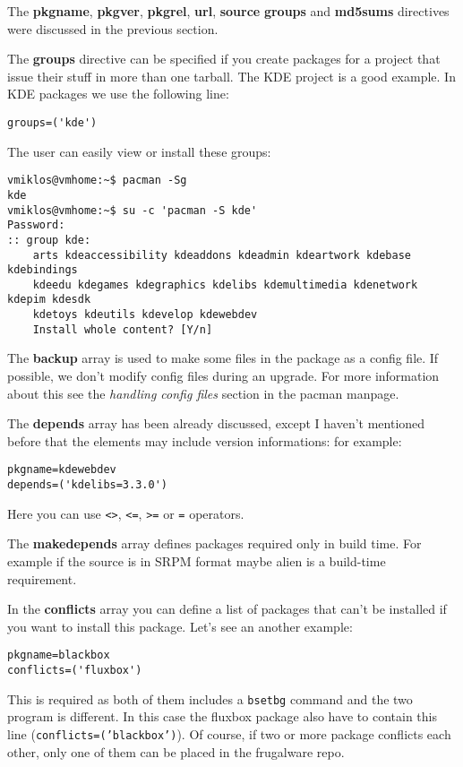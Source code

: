 The \textbf{pkgname}, \textbf{pkgver}, \textbf{pkgrel}, \textbf{url}, \textbf{source} \textbf{groups} and \textbf{md5sums} directives were discussed in the previous section.

The \textbf{groups} directive can be specified if you create packages for a project that issue their stuff in more than one tarball. The KDE project is a good example. In KDE packages we use the following line:
\begin{verbatim}
groups=('kde')
\end{verbatim}

The user can easily view or install these groups:
\begin{verbatim}
vmiklos@vmhome:~$ pacman -Sg
kde
vmiklos@vmhome:~$ su -c 'pacman -S kde'
Password:
:: group kde:
    arts kdeaccessibility kdeaddons kdeadmin kdeartwork kdebase kdebindings
    kdeedu kdegames kdegraphics kdelibs kdemultimedia kdenetwork kdepim kdesdk
    kdetoys kdeutils kdevelop kdewebdev
    Install whole content? [Y/n]
\end{verbatim}

The \textbf{backup} array is used to make some files in the package as a config file. If possible, we don't modify config files during an upgrade. For more information about this see the \textit{handling config files} section in the pacman manpage.

The \textbf{depends} array has been already discussed, except I haven't mentioned before that the elements may include version informations: for example:
\begin{verbatim}
pkgname=kdewebdev
depends=('kdelibs=3.3.0')
\end{verbatim}

Here you can use {\tt <>}, {\tt <=}, {\tt >=} or {\tt =} operators.

The \textbf{makedepends} array defines packages required only in build time. For example if the source is in SRPM format maybe alien is a build-time requirement.

In the \textbf{conflicts} array you can define a list of packages that can't be installed if you want to install this package. Let's see an another example:

\begin{verbatim}
pkgname=blackbox
conflicts=('fluxbox')
\end{verbatim}

This is required as both of them includes a {\tt bsetbg} command and the two program is different. In this case the fluxbox package also have to contain this line ({\tt conflicts=('blackbox')}). Of course, if two or more package conflicts each other, only one of them can be placed in the frugalware repo. 


